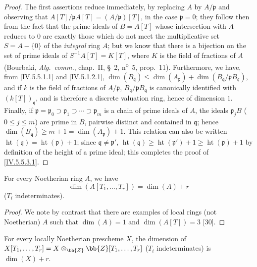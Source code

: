 \begin{proof}
The first assertions reduce immediately, by replacing $A$ by $A/\mathfrak{p}$ and observing that $A[T]/\mathfrak{p}A[T]=(A/\mathfrak{p})[T]$, in the case $\mathfrak{p}=0$; they follow then from the fact that the prime ideals of $B=A[T]$ whose intersection with $A$ reduces to $0$ are exactly those which do not meet the multiplicative set $S=A-\{0\}$ of the \emph{integral} ring $A$; but we know that there is a bijection on the set of prime ideals of $S^{-1}A[T]=K[T]$, where $K$ is the field of fractions of $A$ (Bourbaki, \emph{Alg.\ comm.}, chap.~II, \S~2, n\textsuperscript{o}~5, prop.~11).
Furthermore, we have, from \eqref{IV.5.5.1.1} and \eqref{IV.5.1.2.1}, $\dim(B_\mathfrak{q})\leq\dim(A_\mathfrak{p})+\dim(B_\mathfrak{q}/\mathfrak{p}B_\mathfrak{q})$, and if $k$ is the field of fractions of $A/\mathfrak{p}$, $B_\mathfrak{q}/\mathfrak{p}B_\mathfrak{q}$ is canonically identified with $(k[T])_\mathfrak{q}$, and is therefore a discrete valuation ring, hence of dimension $1$.
Finally, if $\mathfrak{p}=\mathfrak{p}_0\supset\mathfrak{p}_1\supset\cdots\supset\mathfrak{p}_m$ is a chain of prime ideals of $A$, the ideals $\mathfrak{p}_jB$ ($0\leq j\leq m$) are prime in $B$, pairwise distinct and contained in $\mathfrak{q}$; hence $\dim(B_\mathfrak{q})\geq m+1=\dim(A_\mathfrak{p})+1$.
This relation can also be written $\operatorname{ht}(\mathfrak{q})=\operatorname{ht}(\mathfrak{p})+1$; since $\mathfrak{q}\neq\mathfrak{p}'$, $\operatorname{ht}(\mathfrak{q})\geq\operatorname{ht}(\mathfrak{p}')+1\geq\operatorname{ht}(\mathfrak{p})+1$ by definition of the height of a prime ideal; this completes the proof of \eqref{IV.5.5.3.1}.
\end{proof}

\begin{corollary}[5.5.4]
\label{IV.5.5.4}
For every Noetherian ring $A$, we have
\[
\tag{5.5.4.1}\label{IV.5.5.4.1}
  \dim(A[T_1,\ldots,T_r]) = \dim(A) + r
\]
($T_i$ indeterminates).
\end{corollary}

\begin{proof}
We note by contrast that there are examples of local rings (not Noetherian) $A$ such that $\dim(A)=1$ and $\dim(A[T])=3$ [30].
\end{proof}

\begin{corollary}[5.5.5]
\label{IV.5.5.5}
For every locally Noetherian prescheme $X$, the dimension of $X[T_1,\ldots,T_r]=X\otimes_\bb{Z}\bb{Z}[T_1,\ldots,T_r]$ ($T_i$ indeterminates) is $\dim(X)+r$.
\end{corollary}


